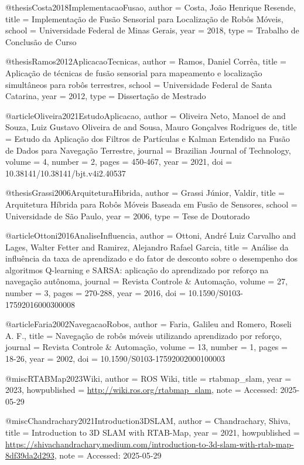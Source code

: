 @thesis{Costa2018ImplementacaoFusao,
  author = {Costa, João Henrique Resende},
  title = {Implementação de Fusão Sensorial para Localização de Robôs Móveis},
  school = {Universidade Federal de Minas Gerais},
  year = {2018},
  type = {Trabalho de Conclusão de Curso}
}

@thesis{Ramos2012AplicacaoTecnicas,
  author = {Ramos, Daniel Corrêa},
  title = {Aplicação de técnicas de fusão sensorial para mapeamento e localização simultâneos para robôs terrestres},
  school = {Universidade Federal de Santa Catarina},
  year = {2012},
  type = {Dissertação de Mestrado}
}

@article{Oliveira2021EstudoAplicacao,
  author = {Oliveira Neto, Manoel de and Souza, Luiz Gustavo Oliveira de and Sousa, Mauro Gonçalves Rodrigues de},
  title = {Estudo da Aplicação dos Filtros de Partículas e Kalman Estendido na Fusão de Dados para Navegação Terrestre},
  journal = {Brazilian Journal of Technology},
  volume = {4},
  number = {2},
  pages = {450-467},
  year = {2021},
  doi = {10.38141/10.38141/bjt.v4i2.40537}
}

@thesis{Grassi2006ArquiteturaHibrida,
  author = {Grassi Júnior, Valdir},
  title = {Arquitetura Híbrida para Robôs Móveis Baseada em Fusão de Sensores},
  school = {Universidade de São Paulo},
  year = {2006},
  type = {Tese de Doutorado}
}

@article{Ottoni2016AnaliseInfluencia,
  author = {Ottoni, André Luiz Carvalho and Lages, Walter Fetter and Ramirez, Alejandro Rafael Garcia},
  title = {Análise da influência da taxa de aprendizado e do fator de desconto sobre o desempenho dos algoritmos Q-learning e SARSA: aplicação do aprendizado por reforço na navegação autônoma},
  journal = {Revista Controle \& Automação},
  volume = {27},
  number = {3},
  pages = {270-288},
  year = {2016},
  doi = {10.1590/S0103-17592016000300008}
}

@article{Faria2002NavegacaoRobos,
  author = {Faria, Galileu and Romero, Roseli A. F.},
  title = {Navegação de robôs móveis utilizando aprendizado por reforço},
  journal = {Revista Controle \& Automação},
  volume = {13},
  number = {1},
  pages = {18-26},
  year = {2002},
  doi = {10.1590/S0103-17592002000100003}
}

@misc{RTABMap2023Wiki,
  author = {ROS Wiki},
  title = {rtabmap\_slam},
  year = {2023},
  howpublished = {\url{http://wiki.ros.org/rtabmap_slam}},
  note = {Accessed: 2025-05-29}
}

@misc{Chandrachary2021Introduction3DSLAM,
  author = {Chandrachary, Shiva},
  title = {Introduction to 3D SLAM with RTAB-Map},
  year = {2021},
  howpublished = {\url{https://shivachandrachary.medium.com/introduction-to-3d-slam-with-rtab-map-8df39da2d293}},
  note = {Accessed: 2025-05-29}
}

